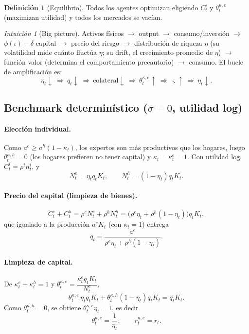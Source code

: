 \documentclass[11pt]{article}
\theoremstyle{definition}
\newtheorem{definicion}{Definición}[section]
\theoremstyle{remark}
\newtheorem*{intuicion}{Intuición}
\newcommand{\aE}{a^{e}}
\newcommand{\aH}{a^{h}}
\newcommand{\re}{\rho^{e}}
\newcommand{\rh}{\rho^{h}}
\newcommand{\thke}{\theta_t^{\kappa,e}}
\newcommand{\thkh}{\theta_t^{\kappa,h}}
\newcommand{\vsig}{\varsigma}
\begin{document}
\begin{definicion}[Equilibrio]
Todos los agentes optimizan eligiendo $C_t^{i}$ y $\thke$ (maximizan utilidad) y todos los mercados se vacían.
\end{definicion}

\begin{intuicion}[Big picture]
Activos físicos $\to$ output $\to$ consumo/inversión $\to$ $\phi(\iota)-\delta$ capital $\to$ precio del riesgo $\to$ distribución de riqueza $\eta$ (su volatilidad mide cuánto fluctúa $\eta$; su drift, el crecimiento promedio de $\eta$) $\to$ función valor (determina el comportamiento precautorio) $\to$ consumo. El bucle de amplificación es:
\[
\eta_t\downarrow\ \Rightarrow\ q_t\downarrow\ \Rightarrow\ \text{colateral}\downarrow\ \Rightarrow\ \thke\uparrow\ \Rightarrow\ \vsig\uparrow\ \Rightarrow\ \eta_t\downarrow.
\]
\end{intuicion}

\subsection{Benchmark determinístico ($\sigma=0$, utilidad log)}

\paragraph{Elección individual.} Como $\aE\ge\aH(1-\kappa_t)$, los expertos son más productivos que los hogares, luego $\thkh=0$ (los hogares prefieren no tener capital) y $\kappa_t=\kappa_t^{e}=1$. Con utilidad log, $C_t^{i}=\rho^{i}n_t^{i}$, y
\[
N_t^{e}=\eta_tq_tK_t,\qquad N_t^{h}=(1-\eta_t)q_tK_t.
\]

\paragraph{Precio del capital (limpieza de bienes).}
\[
C_t^{e}+C_t^{h}=\re N_t^{e}+\rh N_t^{h}=\big(\re\eta_t+\rh(1-\eta_t)\big)q_tK_t,
\]
que igualado a la producción $\aE K_t$ (con $\kappa_t=1$) entrega
\begin{equation}\label{eq:q-det}
q_t=\frac{\aE}{\re\eta_t+\rh(1-\eta_t)}.
\end{equation}

\paragraph{Limpieza de capital.} De $\kappa_t^{e}+\kappa_t^{h}=1$ y $\thke=\dfrac{\kappa_t^{e}q_tK_t}{N_t^{e}}$,
\[
\thke\,\eta_tq_tK_t+\thkh(1-\eta_t)q_tK_t=q_tK_t.
\]
Como $\thkh=0$, se obtiene $\thke\eta_t=1$, es decir
\begin{equation}
\thke=\frac{1}{\eta_t},\qquad r_t^{\kappa,e}=r_t.
\end{equation}
\end{document}
